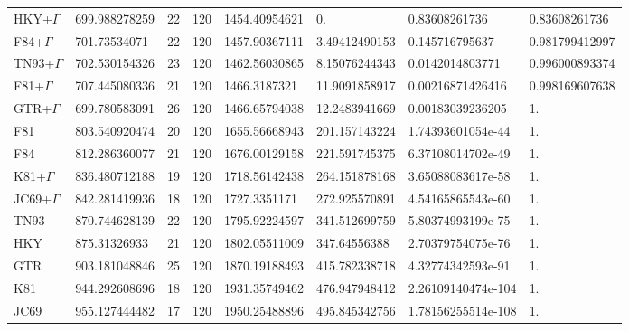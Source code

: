 \begin{refsection}
\begin{center}
\begin{table}[H]
\begin{tabular}{llllllll}
HKY+$\Gamma$ & \scriptsize 699.988278259 & \scriptsize 22 & \scriptsize 120 & \scriptsize 1454.40954621 & \scriptsize 0. & \scriptsize 0.83608261736 & \scriptsize 0.83608261736 \\
F84+$\Gamma$ & \scriptsize 701.73534071 & \scriptsize 22 & \scriptsize 120 & \scriptsize 1457.90367111 & \scriptsize 3.49412490153 & \scriptsize 0.145716795637 & \scriptsize 0.981799412997 \\
TN93+$\Gamma$ &\scriptsize  702.530154326 & \scriptsize 23 & \scriptsize 120 & \scriptsize 1462.56030865 & \scriptsize 8.15076244343 &\scriptsize  0.0142014803771 & \scriptsize 0.996000893374 \\
F81+$\Gamma$ & \scriptsize 707.445080336 & \scriptsize 21 & \scriptsize 120 & \scriptsize 1466.3187321 & \scriptsize 11.9091858917 & \scriptsize 0.00216871426416 & \scriptsize 0.998169607638 \\
GTR+$\Gamma$ & \scriptsize 699.780583091 & \scriptsize 26 & \scriptsize 120 & \scriptsize 1466.65794038 & \scriptsize 12.2483941669 & \scriptsize 0.00183039236205 & \scriptsize 1. \\
F81 & \scriptsize 803.540920474 & \scriptsize 20 & \scriptsize 120 & \scriptsize 1655.56668943 & \scriptsize 201.157143224 & \scriptsize 1.74393601054e-44 & \scriptsize 1. \\
F84 & \scriptsize 812.286360077 & \scriptsize 21 & \scriptsize 120 & \scriptsize 1676.00129158 & \scriptsize 221.591745375 & \scriptsize 6.37108014702e-49 & \scriptsize 1. \\
K81+$\Gamma$ & \scriptsize 836.480712188 & \scriptsize 19 & \scriptsize 120 & \scriptsize 1718.56142438 & \scriptsize 264.151878168 & \scriptsize 3.65088083617e-58 & \scriptsize 1. \\
JC69+$\Gamma$ & \scriptsize 842.281419936 & \scriptsize 18 & \scriptsize 120 & \scriptsize 1727.3351171 & \scriptsize 272.925570891 & \scriptsize 4.54165865543e-60 & \scriptsize 1. \\
TN93 & \scriptsize 870.744628139 & \scriptsize 22 & \scriptsize 120 & \scriptsize 1795.92224597 & \scriptsize 341.512699759 & \scriptsize 5.80374993199e-75 & \scriptsize 1. \\
HKY & \scriptsize 875.31326933 & \scriptsize 21 & \scriptsize 120 & \scriptsize 1802.05511009 & \scriptsize 347.64556388 & \scriptsize 2.70379754075e-76 & \scriptsize 1. \\
GTR & \scriptsize 903.181048846 & \scriptsize 25 & \scriptsize 120 & \scriptsize 1870.19188493 & \scriptsize 415.782338718 & \scriptsize 4.32774342593e-91 & \scriptsize 1. \\
K81 & \scriptsize 944.292608696 & \scriptsize 18 & \scriptsize 120 & \scriptsize 1931.35749462 & \scriptsize 476.947948412 & \scriptsize 2.26109140474e-104 & \scriptsize 1. \\
JC69 & \scriptsize 955.127444482 & \scriptsize 17 & \scriptsize 120 & \scriptsize 1950.25488896 & \scriptsize 495.845342756 & \scriptsize 1.78156255514e-108 & \scriptsize 1. \\\hline


\end{tabular}
\end{table}
\end{center}
\end{refsection}
